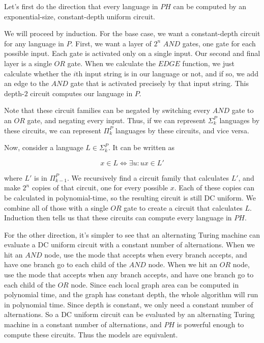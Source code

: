 \documentclass{article}
\newenvironment{problem}[2][Problem]{\begin{trivlist}
\item[\hskip \labelsep {\bfseries #1}\hskip \labelsep {\bfseries #2.}]}{\end{trivlist}}
\begin{document}
\begin{problem}{4}
  Let's first do the direction that every language in $PH$ can be
  computed by an exponential-size, constant-depth uniform circuit.

  We will proceed by induction. For the base case, we want a
  constant-depth circuit for any language in $P$. First, we want a
  layer of $2^n$ $AND$ gates, one gate for each possible input. Each
  gate is activated only on a single input. Our second and final layer is
  a single $OR$ gate. When we calculate the $EDGE$
  function, we just calculate whether the $i$th input string is in our
  language or not, and if so, we add an edge to the $AND$ gate that is
  activated precisely by that input string. This depth-$2$ circuit
  computes our language in $P$.

  Note that these circuit families can be negated by switching every $AND$
  gate to an $OR$ gate, and negating every input. Thus, if we can
  represent $\Sigma_k^P$ languages by these circuits, we can represent $\Pi_k^P$
  languages by these circuits, and vice versa.

  Now, consider a language $L \in \Sigma_k^P$. It can be written as

  \begin{equation}
    x \in L \iff \exists u : ux \in L'
  \end{equation}

  where $L'$ is in $\Pi_{k-1}^P$. We recursively find a circuit family
  that calculates $L'$, and make $2^n$ copies of that circuit, one for
  every possible $x$. Each of these copies can be calculated in
  polynomial-time, so the resulting circuit is still DC uniform. We
  combine all of those with a single $OR$ gate to create a circuit
  that calculates $L$. Induction then tells us that these circuits can
  compute every language in $PH$.

  For the other direction, it's simpler to see that an alternating
  Turing machine can evaluate a DC uniform circuit with a constant
  number of alternations. When we hit an $AND$ node, use the mode that
  accepts when every branch accepts, and have one branch go to each
  child of the $AND$ node. When we hit an $OR$ node, use the mode that
  accepts when any branch accepts, and have one branch go to each
  child of the $OR$ node. Since each local graph area can be computed
  in polynomial time, and the graph has constant depth, the whole
  algorithm will run in polynomial time. Since depth is constant, we
  only need a constant number of alternations. So a DC uniform circuit
  can be evaluated by an alternating Turing machine in a constant
  number of alternations, and $PH$ is powerful enough to compute these
  circuits. Thus the models are equivalent.
\end{problem}
\end{document}
